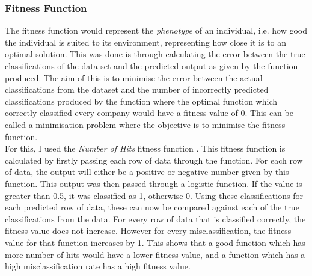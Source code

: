 \documentclass[11pt]{article}
\begin{document}
\subsubsection{Fitness Function}
The fitness function would represent the \textit{phenotype} of an individual, i.e. how good the individual is suited to its environment, representing how close it is to an optimal solution. This was done is through calculating the error between the true classifications of the data set and the predicted output as given by the function produced. The aim of this is to minimise the error between the actual classifications from the dataset and the number of incorrectly predicted classifications produced by the function where the optimal function which correctly classified every company would have a fitness value of 0. This can be called a minimisation problem where the objective is to minimise the fitness function. \\
For this, I used the \textit{Number of Hits} fitness function \cite{?} . This fitness function is calculated by firstly passing each row of data through the function. For each row of data, the output will either be a positive or negative number given by this function. This output was then passed through a logistic function. If the value is greater than 0.5, it was classified as 1, otherwise 0. Using these classifications for each predicted row of data, these can now be compared against each of the true classifications from the data. For every row of data that is classified correctly, the fitness value does not increase. However for every misclassification, the fitness value for that function increases by 1. This shows that a good function which has more number of hits would have a lower fitness value, and a function which has a high misclassification rate has a high fitness value. 
\end{document}
